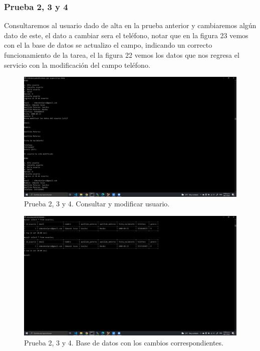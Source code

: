 \documentclass[11pt]{article}
\begin{document}
		\subsubsection{Prueba 2, 3 y 4}		
Consultaremos al usuario dado de alta en la prueba anterior y cambiaremos algún dato de este, el dato a cambiar sera el teléfono, notar que en la figura 23 vemos con el la base de datos se actualizo el campo, indicando un correcto funcionamiento de la tarea, el la figura 22 vemos los datos que nos regresa el servicio con la modificación del campo teléfono.
		\begin{figure}[H]
			\centering
			\includegraphics[scale=0.34]{resources/prueba2-3.png}
			\caption{Prueba 2, 3 y 4. Consultar y modificar usuario.}\label{fig:picture}
		\end{figure}
		\begin{figure}[H]
			\centering
			\includegraphics[scale=0.34]{resources/prueba2-3mysql.png}
			\caption{Prueba 2, 3 y 4. Base de datos con los cambios correspondientes.}\label{fig:picture}
		\end{figure}
\end{document}
